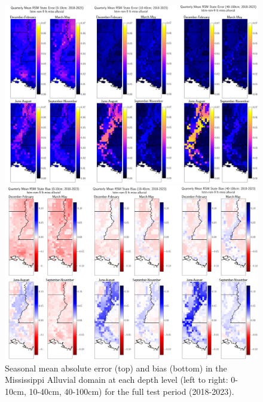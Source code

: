 \begin{figure}[h!p]
    \centering

    \includegraphics[width=.9\linewidth,draft=false]{figures/lt-miss-alluvial/eval-grid_lt-miss-alluvial_lstm-rsm-9_pixelwise-time-stats_abs-err_qtrly-err-state-all-3.png}

    \includegraphics[width=.9\linewidth,draft=false]{figures/lt-miss-alluvial/eval-grid_lt-miss-alluvial_lstm-rsm-9_pixelwise-time-stats_bias_qtrly-err-state-all-3.png}

    \caption{Seasonal mean absolute error (top) and bias (bottom) in the Mississippi Alluvial domain at each depth level (left to right: 0-10cm, 10-40cm, 40-100cm) for the full test period (2018-2023).}
    \label{lt_mae-bias_miss-alluvial}
\end{figure}


